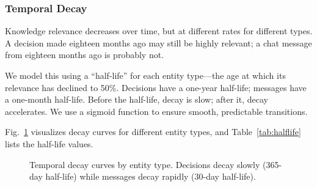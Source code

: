 \documentclass[10pt,journal,compsoc]{IEEEtran}
\begin{document}
\subsubsection{Temporal Decay}

Knowledge relevance decreases over time, but at different rates for different types. A decision made eighteen months ago may still be highly relevant; a chat message from eighteen months ago is probably not.

We model this using a ``half-life'' for each entity type---the age at which its relevance has declined to 50\%. Decisions have a one-year half-life; messages have a one-month half-life. Before the half-life, decay is slow; after it, decay accelerates. We use a sigmoid function to ensure smooth, predictable transitions.

Fig.~\ref{fig:decay-curves} visualizes decay curves for different entity types, and Table~\ref{tab:halflife} lists the half-life values.

\begin{figure}[t]
\centering
{}
\caption{Temporal decay curves by entity type. Decisions decay slowly (365-day half-life) while messages decay rapidly (30-day half-life).}
\label{fig:decay-curves}
\end{figure}
\end{document}
